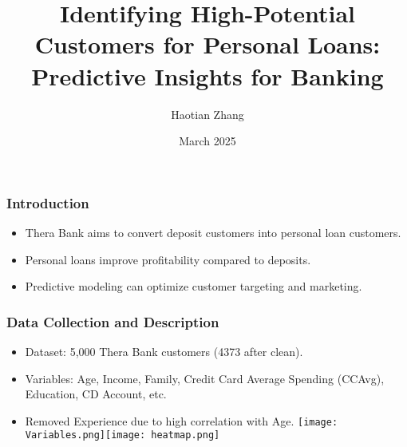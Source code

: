 \documentclass{beamer}
\title{Identifying High-Potential Customers for Personal Loans: Predictive Insights for Banking}
\author{Haotian Zhang}
\institute{University of Oklahoma}
\date{March 2025}
\begin{document}

\frame{\titlepage}


\begin{frame}
\frametitle{Introduction}
\begin{itemize}
  \item Thera Bank aims to convert deposit customers into personal loan customers.
  \item Personal loans improve profitability compared to deposits.
  \item Predictive modeling can optimize customer targeting and marketing.
\end{itemize}
\end{frame}

\begin{frame}
\frametitle{Data Collection and Description}
\begin{itemize}
  \item Dataset: 5,000 Thera Bank customers (4373 after clean).
  \item Variables: Age, Income, Family, Credit Card Average Spending (CCAvg), Education, CD Account, etc.
  \item Removed Experience due to high correlation with Age.
\texttt{[image: Variables.png]}\texttt{[image: heatmap.png]}
  
\end{itemize}
\end{frame}
\end{document}

